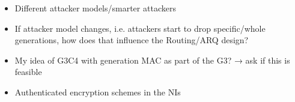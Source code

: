 \begin{itemize}
    \item Different attacker models/smarter attackers
    \item If attacker model changes, i.e. attackers start to drop specific/whole generations,
        how does that influence the Routing/ARQ design?
    \item My idea of G3C4 with generation MAC as part of the G3? → ask if this is feasible
    \item Authenticated encryption schemes in the NIs
\end{itemize}

